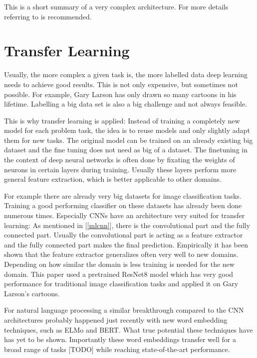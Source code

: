 \documentclass[draft,final,oneside]{vutinfth} %
\begin{document}
This is a short summary of a very complex architecture. For more details referring to \cite{elmo} is recommended.



\section{Transfer Learning} \label{transferlearning}

Usually, the more complex a given task is, the more labelled data deep learning needs to achieve good results. This is not only expensive, but sometimes not possible. For example, Gary Larson has only drawn so many cartoons in his lifetime. Labelling a big data set is also a big challenge and not always feasible.

This is why transfer learning is applied: Instead of training a completely new model for each problem task, the idea is to reuse models and only slightly adapt them for new tasks. The original model can be trained on an already existing big dataset and the fine tuning does not need as big of a dataset. The finetuning in the context of deep neural networks is often done by fixating the weights of neurons in certain layers during training. Usually these layers perform more general feature extraction, which is better applicable to other domains.

For example there are already very big datasets for image classification tasks. Training a good performing classifier on these datasets has already been done numerous times. Especially CNNs have an architecture very suited for transfer learning: As mentioned in [\ref{mlcnn}], there is the convolutional part and the fully connected part. Usually the convolutional part is acting as a feature extractor and the fully connected part makes the final prediction. Empirically it has been shown that the feature extractor generalizes often very well to new domains. Depending on how similar the domain is less training is needed for the new domain. This paper used a pretrained ResNet8 model which has very good performance for traditional image classification tasks and applied it on Gary Larson's cartoons.

For natural language processing a similar breakthrough compared to the CNN architectures probably happened just recently with new word embedding techniques, such as ELMo and BERT. What true potential these techniques have has yet to be shown. Importantly these word embeddings transfer well for a broad range of tasks [TODO] while reaching state-of-the-art performance. 
\end{document}
